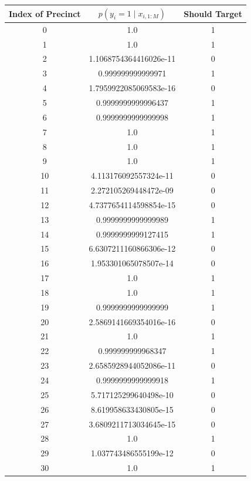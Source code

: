 \documentclass[12pt]{article}
\begin{document}
\begin{enumerate}[label=(\Alph*)]
\begin{enumerate}[label=(\roman*)]
  		\begin{table}
  			\small
  			\centering
  			\begin{tabular}{ |c|c|c| } 
  				\hline
  			    Index of Precinct & $p(y_{i} = 1 \mid x_{i, 1:M})$ & Should Target \\
					 \hline
					   0  & 1.0 & 1 \\
						 1  & 1.0 & 1 \\
						 2  & 1.1068754364416026e-11 & 0 \\
						 3  & 0.999999999999971 & 1 \\
						 4  & 1.7959922085069583e-16 & 0 \\
						 5  & 0.9999999999996437 & 1 \\
						 6  & 0.9999999999999998 & 1 \\
						 7  & 1.0 & 1 \\
						 8  & 1.0 & 1 \\
						 9  & 1.0 & 1 \\
						 10 &  4.113176092557324e-11 & 0 \\
						 11 &  2.272105269448472e-09 & 0 \\
						 12 &  4.7377654114598854e-15 & 0 \\
						 13 &  0.9999999999999989 & 1 \\
						 14 &  0.9999999999127415 & 1 \\
						 15 &  6.6307211160866306e-12 & 0 \\
						 16 &  1.953301065078507e-14 & 0 \\
						 17 &  1.0 & 1 \\
						 18 &  1.0 & 1 \\
						 19 &  0.9999999999999999 & 1 \\
						 20 &  2.5869141669354016e-16 & 0 \\
						 21 &  1.0 & 1 \\
						 22 &  0.999999999968347 & 1 \\
						 23 &  2.6585928944052086e-11 & 0 \\
						 24 &  0.9999999999999918 & 1 \\
						 25 &  5.717125299640498e-10 & 0 \\
						 26 &  8.619958633430805e-15 & 0 \\
						 27 &  3.6809211713034645e-15 & 0 \\
						 28 &  1.0 & 1 \\
						 29 &  1.037743486555199e-12 & 0 \\
						 30 &  1.0 & 1 \\

\end{tabular}
\end{table}
\end{enumerate}
\end{enumerate}
\end{document}
